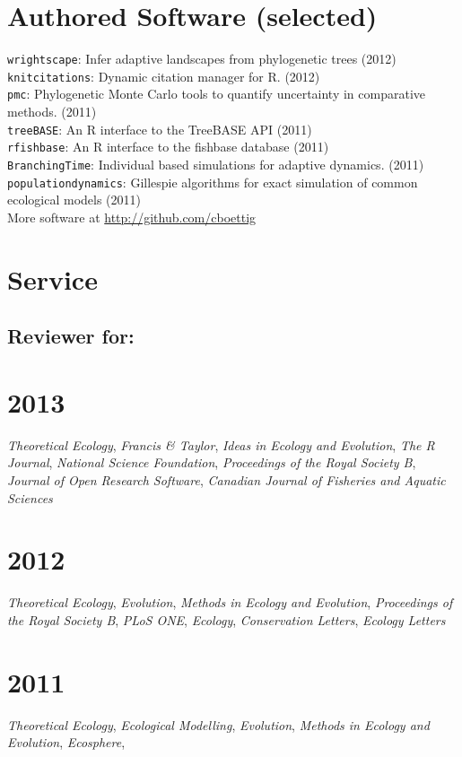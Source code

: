 \documentclass[margin]{res}
\begin{document}
\begin{resume}
  
  \section{Authored Software (selected)} 
{ \footnotesize
\texttt{wrightscape}: Infer adaptive landscapes from phylogenetic trees (2012) \\
\texttt{knitcitations}: Dynamic citation manager for R. (2012) \\
\texttt{pmc}: Phylogenetic Monte Carlo tools to quantify uncertainty in comparative methods. (2011)\\
\texttt{treeBASE}: An R interface to the TreeBASE API (2011) \\
\texttt{rfishbase}: An R interface to the fishbase database (2011) \\
\texttt{BranchingTime}: Individual based simulations for adaptive dynamics. (2011) \\
\texttt{populationdynamics}: Gillespie algorithms for exact simulation of common ecological models (2011) \\ 
More software at \href{http://github.com/cboettig}{http://github.com/cboettig}
}

\section{Service}
\subsection{Reviewer for:}
\section{\textnormal{2013}}
\emph{Theoretical Ecology}, \emph{Francis \& Taylor}, \emph{Ideas in Ecology and Evolution}, \emph{The R Journal}, \emph{National Science Foundation}, \emph{Proceedings of the Royal Society B}, \emph{Journal of Open Research Software}, \emph{Canadian Journal of Fisheries and Aquatic Sciences} 

\section{\textnormal{2012}}
\emph{Theoretical Ecology}, \emph{Evolution}, \emph{Methods in Ecology and Evolution}, \emph{Proceedings of the Royal Society B}, \emph{PLoS ONE}, \emph{Ecology}, \emph{Conservation Letters}, \emph{Ecology Letters} 

\section{\textnormal{2011}}
\emph{Theoretical Ecology}, \emph{Ecological Modelling}, \emph{Evolution}, \emph{Methods in Ecology and Evolution}, \emph{Ecosphere}, 


\end{resume}
\end{document}

